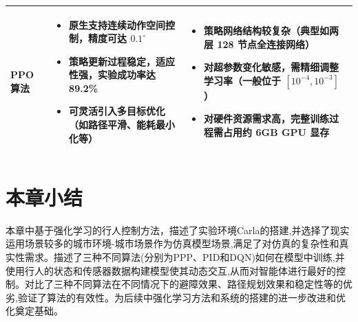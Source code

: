 \begin{table}[H]
\begin{tabular}{
  >{\centering\arraybackslash}p{2.8cm}
  >{\centering\arraybackslash}p{6.2cm}
  >{\centering\arraybackslash}p{6.2cm}
}
PPO 算法 &
\begin{itemize}[leftmargin=4mm,noitemsep]
  \item 原生支持连续动作空间控制，精度可达 $0.1^\circ$
  \item 策略更新过程稳定，适应性强，实验成功率达 89.2\%
  \item 可灵活引入多目标优化（如路径平滑、能耗最小化等）
\end{itemize} &
\begin{itemize}[leftmargin=4mm,noitemsep]
  \item 策略网络结构较复杂（典型如两层 128 节点全连接网络）
  \item 对超参数变化敏感，需精细调整学习率（一般位于 $[10^{-4}, 10^{-3}]$）
  \item 对硬件资源需求高，完整训练过程需占用约 6GB GPU 显存
\end{itemize} \\
\bottomrule
\end{tabular}
\end{table}

\section{本章小结}

本章中基于强化学习的行人控制方法，描述了实验环境Carla的搭建,并选择了现实运用场景较多的城市环境-城市场景作为仿真模型场景,满足了对仿真的复杂性和真实性需求。描述了三种不同算法(分别为PPP、PID和DQN)如何在模型中训练,并使用行人的状态和传感器数据构建模型使其动态交互,从而对智能体进行最好的控制。对比了三种不同算法在不同情况下的避障效果、路径规划效果和稳定性等的优劣,验证了算法的有效性。为后续中强化学习方法和系统的搭建的进一步改进和优化奠定基础。
